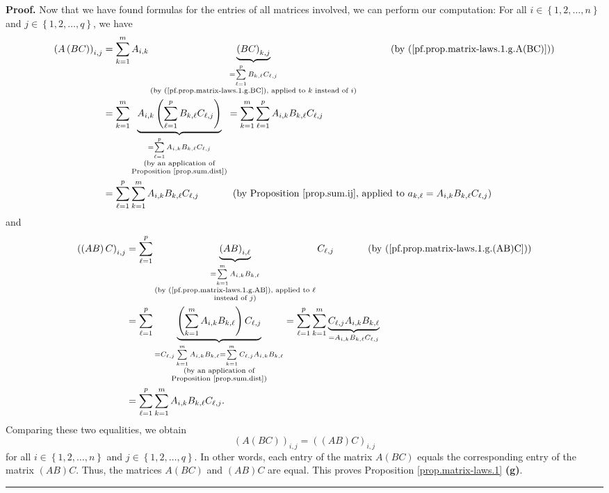 \documentclass[numbers=enddot,12pt,final,onecolumn,notitlepage]{scrartcl}%
\theoremstyle{definition}
\newenvironment{proof}[1][Proof]{\noindent\textbf{#1.} }{\ \rule{0.5em}{0.5em}}
\let\sumnonlimits\sum
\renewcommand{\sum}{\sumnonlimits\limits}
\begin{document}
\begin{proof}
Now that we have found formulas for the entries of all matrices involved, we
can perform our computation: For all $i\in\left\{  1,2,\ldots,n\right\}  $ and
$j\in\left\{  1,2,\ldots,q\right\}  $, we have%
\begin{align*}
\left(  A\left(  BC\right)  \right)  _{i,j}  &  =\sum_{k=1}^{m}A_{i,k}%
\underbrace{\left(  BC\right)  _{k,j}}_{\substack{=\sum_{\ell=1}^{p}B_{k,\ell
}C_{\ell,j}\\\text{(by (\ref{pf.prop.matrix-laws.1.g.BC}), applied to }k\text{
instead of }i\text{)}}}\ \ \ \ \ \ \ \ \ \ \left(  \text{by
(\ref{pf.prop.matrix-laws.1.g.A(BC)})}\right) \\
&  =\sum_{k=1}^{m}\underbrace{A_{i,k}\left(  \sum_{\ell=1}^{p}B_{k,\ell
}C_{\ell,j}\right)  }_{\substack{=\sum_{\ell=1}^{p}A_{i,k}B_{k,\ell}C_{\ell
,j}\\\text{(by an application of}\\\text{Proposition \ref{prop.sum.dist})}%
}}=\sum_{k=1}^{m}\sum_{\ell=1}^{p}A_{i,k}B_{k,\ell}C_{\ell,j}\\
&  =\sum_{\ell=1}^{p}\sum_{k=1}^{m}A_{i,k}B_{k,\ell}C_{\ell,j}%
\ \ \ \ \ \ \ \ \ \ \left(  \text{by Proposition \ref{prop.sum.ij}, applied to
}a_{k,\ell}=A_{i,k}B_{k,\ell}C_{\ell,j}\right)
\end{align*}
and%
\begin{align*}
\left(  \left(  AB\right)  C\right)  _{i,j}  &  =\sum_{\ell=1}^{p}%
\underbrace{\left(  AB\right)  _{i,\ell}}_{\substack{=\sum_{k=1}^{m}%
A_{i,k}B_{k,\ell}\\\text{(by (\ref{pf.prop.matrix-laws.1.g.AB}), applied to
}\ell\\\text{instead of }j\text{)}}}C_{\ell,j}\ \ \ \ \ \ \ \ \ \ \left(
\text{by (\ref{pf.prop.matrix-laws.1.g.(AB)C})}\right) \\
&  =\sum_{\ell=1}^{p}\underbrace{\left(  \sum_{k=1}^{m}A_{i,k}B_{k,\ell
}\right)  C_{\ell,j}}_{\substack{=C_{\ell,j}\sum_{k=1}^{m}A_{i,k}B_{k,\ell
}=\sum_{k=1}^{m}C_{\ell,j}A_{i,k}B_{k,\ell}\\\text{(by an application
of}\\\text{Proposition \ref{prop.sum.dist})}}}=\sum_{\ell=1}^{p}\sum_{k=1}%
^{m}\underbrace{C_{\ell,j}A_{i,k}B_{k,\ell}}_{=A_{i,k}B_{k,\ell}C_{\ell,j}}\\
&  =\sum_{\ell=1}^{p}\sum_{k=1}^{m}A_{i,k}B_{k,\ell}C_{\ell,j}.
\end{align*}
Comparing these two equalities, we obtain
\[
\left(  A\left(  BC\right)  \right)  _{i,j}=\left(  \left(  AB\right)
C\right)  _{i,j}%
\]
for all $i\in\left\{  1,2,\ldots,n\right\}  $ and $j\in\left\{  1,2,\ldots
,q\right\}  $. In other words, each entry of the matrix $A\left(  BC\right)  $
equals the corresponding entry of the matrix $\left(  AB\right)  C$. Thus, the
matrices $A\left(  BC\right)  $ and $\left(  AB\right)  C$ are equal. This
proves Proposition \ref{prop.matrix-laws.1} \textbf{(g)}.
\end{proof}
\end{document}
